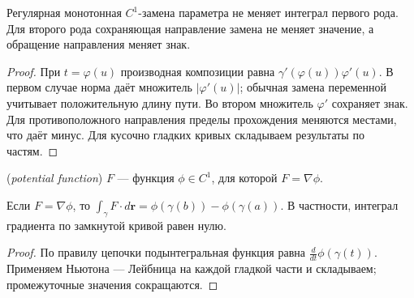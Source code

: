 \ifdim\dimexpr\ht\CatFlowBox+\dp\CatFlowBox\relax<64mm\dp\CatFlowBox=\dimexpr64mm-\ht\CatFlowBox\relax\fi%
\noindent\usebox{\CatFlowBox}\par\addvspace{5pt}
\begin{theorem}
Регулярная монотонная \(C^1\)-замена параметра не меняет интеграл первого рода. Для второго рода сохраняющая направление замена не меняет значение, а обращение направления меняет знак.
\end{theorem}
\begin{proof}При \(t=\varphi(u)\) производная композиции равна \(\gamma'(\varphi(u))\varphi'(u)\). В первом случае норма даёт множитель \(|\varphi'(u)|\); обычная замена переменной учитывает положительную длину пути. Во втором множитель \(\varphi'\) сохраняет знак. Для противоположного направления пределы прохождения меняются местами, что даёт минус. Для кусочно гладких кривых складываем результаты по частям.\end{proof}
\begin{definition} (\emph{potential function}) \(F\) — функция \(\phi\in C^1\), для которой \(F=\nabla\phi\).\end{definition}
\begin{theorem}
Если \(F=\nabla\phi\), то \(\int_\gamma F\cdot d\symbf r=\phi(\gamma(b))-\phi(\gamma(a))\). В частности, интеграл градиента по замкнутой кривой равен нулю.
\end{theorem}
\begin{proof}По правилу цепочки подынтегральная функция равна \(\frac d{dt}\phi(\gamma(t))\). Применяем Ньютона — Лейбница на каждой гладкой части и складываем; промежуточные значения сокращаются.\end{proof}

